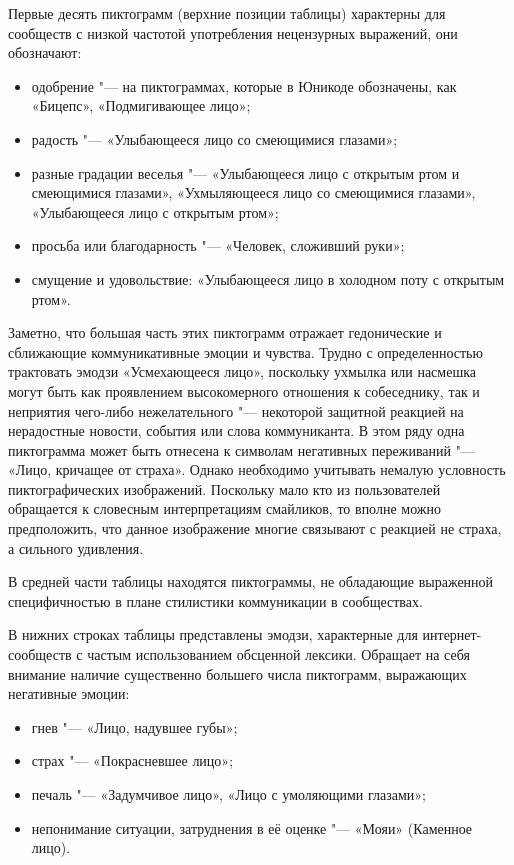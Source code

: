 Первые десять пиктограмм (верхние позиции таблицы) характерны для сообществ с низкой частотой употребления нецензурных выражений, они обозначают:
\begin{itemize}
	\item одобрение "--- на пиктограммах, которые в Юникоде обозначены, как «Бицепс», «Подмигивающее лицо»;
	\item радость "--- «Улыбающееся лицо со смеющимися глазами»;
	\item разные градации веселья "--- «Улыбающееся лицо с открытым ртом и смеющимися глазами», «Ухмыляющееся лицо со смеющимися глазами», «Улыбающееся лицо с открытым ртом»;
	\item просьба или благодарность "--- «Человек, сложивший руки»;
	\item смущение и удовольствие: «Улыбающееся лицо в холодном поту с открытым ртом».
\end{itemize}

Заметно, что большая часть этих пиктограмм отражает гедонические и сближающие коммуникативные эмоции и чувства. Трудно с определенностью трактовать эмодзи «Усмехающееся лицо», поскольку ухмылка или насмешка могут быть как проявлением высокомерного отношения к собеседнику, так и неприятия чего-либо нежелательного "--- некоторой защитной реакцией на нерадостные новости, события или слова коммуниканта. В этом ряду одна пиктограмма может быть отнесена к символам негативных переживаний "--- «Лицо, кричащее от страха». Однако необходимо учитывать немалую условность пиктографических изображений. Поскольку мало кто из пользователей обращается к словесным интерпретациям смайликов, то вполне можно предположить, что данное изображение многие связывают с реакцией не страха, а сильного удивления. 

В средней части таблицы находятся пиктограммы, не обладающие выраженной специфичностью в плане стилистики коммуникации в сообществах.

В нижних строках таблицы представлены эмодзи, характерные для интернет-сообществ с частым использованием обсценной лексики. Обращает на себя внимание наличие существенно большего числа пиктограмм, выражающих негативные эмоции:
\begin{itemize}
	\item гнев "--- «Лицо, надувшее губы»; 
	\item страх "--- «Покрасневшее лицо»; 
	\item печаль "--- «Задумчивое лицо», «Лицо с умоляющими глазами»; 
	\item непонимание ситуации, затруднения в её оценке "--- «Мояи» (Каменное лицо).
\end{itemize}

